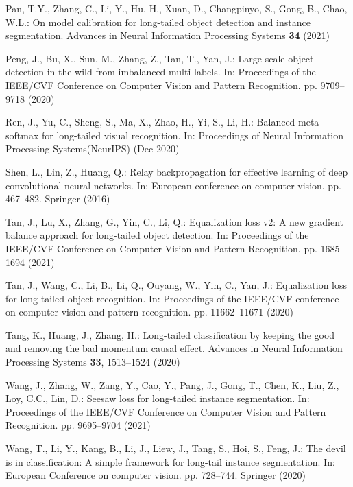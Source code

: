 \documentclass[runningheads]{llncs}
\begin{document}
\begin{thebibliography}{10}
Pan, T.Y., Zhang, C., Li, Y., Hu, H., Xuan, D., Changpinyo, S., Gong, B., Chao,
  W.L.: On model calibration for long-tailed object detection and instance
  segmentation. Advances in Neural Information Processing Systems  \textbf{34}
  (2021)

Peng, J., Bu, X., Sun, M., Zhang, Z., Tan, T., Yan, J.: Large-scale object
  detection in the wild from imbalanced multi-labels. In: Proceedings of the
  IEEE/CVF Conference on Computer Vision and Pattern Recognition. pp.
  9709--9718 (2020)

Ren, J., Yu, C., Sheng, S., Ma, X., Zhao, H., Yi, S., Li, H.: Balanced
  meta-softmax for long-tailed visual recognition. In: Proceedings of Neural
  Information Processing Systems(NeurIPS) (Dec 2020)

Shen, L., Lin, Z., Huang, Q.: Relay backpropagation for effective learning of
  deep convolutional neural networks. In: European conference on computer
  vision. pp. 467--482. Springer (2016)

Tan, J., Lu, X., Zhang, G., Yin, C., Li, Q.: Equalization loss v2: A new
  gradient balance approach for long-tailed object detection. In: Proceedings
  of the IEEE/CVF Conference on Computer Vision and Pattern Recognition. pp.
  1685--1694 (2021)

Tan, J., Wang, C., Li, B., Li, Q., Ouyang, W., Yin, C., Yan, J.: Equalization
  loss for long-tailed object recognition. In: Proceedings of the IEEE/CVF
  conference on computer vision and pattern recognition. pp. 11662--11671
  (2020)

Tang, K., Huang, J., Zhang, H.: Long-tailed classification by keeping the good
  and removing the bad momentum causal effect. Advances in Neural Information
  Processing Systems  \textbf{33},  1513--1524 (2020)

Wang, J., Zhang, W., Zang, Y., Cao, Y., Pang, J., Gong, T., Chen, K., Liu, Z.,
  Loy, C.C., Lin, D.: Seesaw loss for long-tailed instance segmentation. In:
  Proceedings of the IEEE/CVF Conference on Computer Vision and Pattern
  Recognition. pp. 9695--9704 (2021)

Wang, T., Li, Y., Kang, B., Li, J., Liew, J., Tang, S., Hoi, S., Feng, J.: The
  devil is in classification: A simple framework for long-tail instance
  segmentation. In: European Conference on computer vision. pp. 728--744.
  Springer (2020)


\end{thebibliography}
\end{document}
